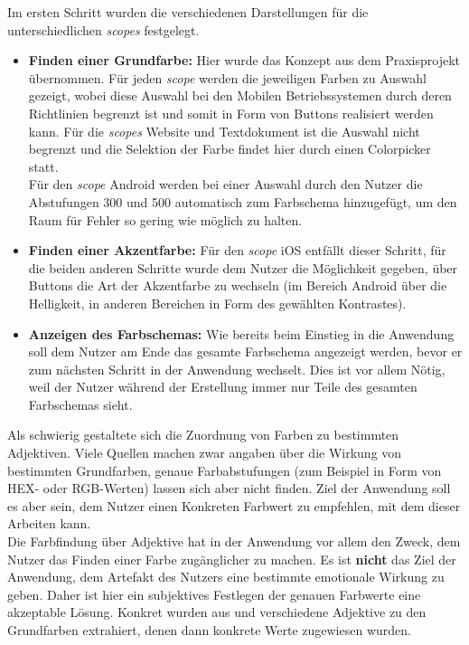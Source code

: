 Im ersten Schritt wurden die verschiedenen Darstellungen für die unterschiedlichen \textit{scopes} festgelegt.

\begin{itemize}
  \item \textbf{Finden einer Grundfarbe:} Hier wurde das Konzept aus dem Praxisprojekt übernommen. Für jeden \textit{scope} werden die jeweiligen Farben zu Auswahl gezeigt, wobei diese Auswahl bei den Mobilen Betriebssystemen durch deren Richtlinien begrenzt ist und somit in Form von Buttons realisiert werden kann.
Für die \textit{scopes} Website und Textdokument ist die Auswahl nicht begrenzt und die Selektion der Farbe findet hier durch einen Colorpicker statt.\\
Für den \textit{scope} Android werden bei einer Auswahl durch den Nutzer die Abstufungen 300 und 500 automatisch zum Farbschema hinzugefügt, um den Raum für Fehler so gering wie möglich zu halten.
  \item \textbf{Finden einer Akzentfarbe:} Für den \textit{scope} iOS entfällt dieser Schritt, für die beiden anderen Schritte wurde dem Nutzer die Möglichkeit gegeben, über Buttons die Art der Akzentfarbe zu wechseln (im Bereich Android über die Helligkeit, in anderen Bereichen in Form des gewählten Kontrastes).
  \item \textbf{Anzeigen des Farbschemas:} Wie bereits beim Einstieg in die Anwendung soll dem Nutzer am Ende das gesamte Farbschema angezeigt werden, bevor er zum nächsten Schritt in der Anwendung wechselt. Dies ist vor allem Nötig, weil der Nutzer während der Erstellung immer nur Teile des gesamten Farbschemas sieht.
\end{itemize}

Als schwierig gestaltete sich die Zuordnung von Farben zu bestimmten Adjektiven. Viele Quellen machen zwar angaben über die Wirkung von bestimmten Grundfarben, genaue Farbabstufungen (zum Beispiel in Form von HEX- oder RGB-Werten) lassen sich aber nicht finden. Ziel der Anwendung soll es aber sein, dem Nutzer einen Konkreten Farbwert zu empfehlen, mit dem dieser Arbeiten kann. \\
Die Farbfindung über Adjektive hat in der Anwendung vor allem den Zweck, dem Nutzer das Finden einer Farbe zugänglicher zu machen. Es ist \textbf{nicht} das Ziel der Anwendung, dem Artefakt des Nutzers eine bestimmte emotionale Wirkung zu geben. Daher ist hier ein subjektives Festlegen der genauen Farbwerte eine akzeptable Lösung. Konkret wurden aus \cite{Wright2017Color} und \cite{Cooper200903} verschiedene Adjektive zu den Grundfarben extrahiert, denen dann konkrete Werte zugewiesen wurden.

